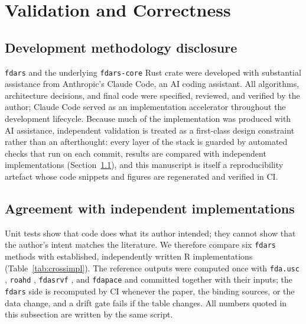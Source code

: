 \section{Validation and Correctness}
\label{sec:validation}

\subsection*{Development methodology disclosure}

\texttt{fdars} and the underlying \texttt{fdars-core} Rust crate were developed
with substantial assistance from Anthropic's Claude Code, an AI coding assistant.
All algorithms, architecture decisions, and final code were specified, reviewed,
and verified by the author; Claude Code served as an implementation accelerator
throughout the development lifecycle.  Because much of the implementation was
produced with AI assistance, independent validation is treated as a first-class
design constraint rather than an afterthought: every layer of the stack is
guarded by automated checks that run on each commit, results are compared with
independent implementations (Section~\ref{subsec:crossimpl}), and this
manuscript is itself a reproducibility artefact whose code snippets and figures
are regenerated and verified in CI.

\subsection{Agreement with independent implementations}
\label{subsec:crossimpl}

Unit tests show that code does what its author intended; they cannot show that
the author's intent matches the literature.  We therefore compare six
\texttt{fdars} methods with established, independently written R
implementations (Table~\ref{tab:crossimpl}).  The reference outputs were
computed once with \texttt{fda.usc} \citep{febrerobande_fdausc_2012},
\texttt{roahd} \citep{r_roahd}, \texttt{fdasrvf} \citep{r_fdasrvf}, and
\texttt{fdapace} \citep{r_fdapace} and committed together with their inputs;
the \texttt{fdars} side is recomputed by CI whenever the paper, the binding
sources, or the data change, and a drift gate fails if the table changes.
All numbers quoted in this subsection are written by the same script.



